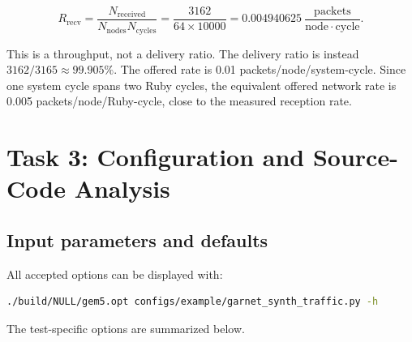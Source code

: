 \documentclass[11pt,a4paper]{article}
\begin{document}
\begin{equation}
R_{\mathrm{recv}}
=\frac{N_{\mathrm{received}}}{N_{\mathrm{nodes}}N_{\mathrm{cycles}}}
=\frac{3162}{64\times10000}
=0.004940625\ \frac{\mathrm{packets}}{\mathrm{node\cdot cycle}}.
\end{equation}

This is a throughput, not a delivery ratio. The delivery ratio is instead
$3162/3165\approx99.905\%$. The offered rate is
0.01 packets/node/system-cycle. Since one system cycle spans two Ruby cycles,
the equivalent offered network rate is 0.005 packets/node/Ruby-cycle, close to
the measured reception rate.

\section{Task 3: Configuration and Source-Code Analysis}

\subsection{Input parameters and defaults}

All accepted options can be displayed with:

\begin{lstlisting}[language=bash]
./build/NULL/gem5.opt configs/example/garnet_synth_traffic.py -h
\end{lstlisting}

The test-specific options are summarized below.
\end{document}
